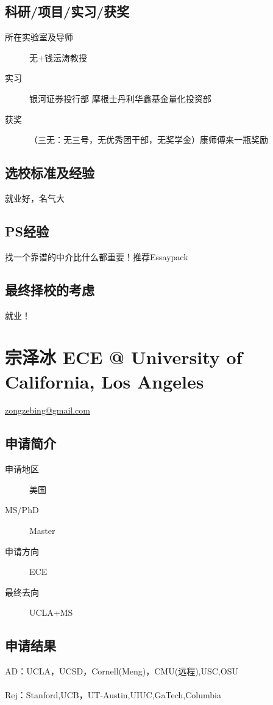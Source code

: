 \documentclass[11pt,fleqn,openany]{book} %
\begin{document}
\subsection*{科研/项目/实习/获奖}
\begin{description}
\item[所在实验室及导师] 无+钱沄涛教授
\item[实习] 银河证券投行部
摩根士丹利华鑫基金量化投资部
\item[获奖] （三无：无三号，无优秀团干部，无奖学金）康师傅来一瓶奖励
\end{description}
\subsection*{选校标准及经验}
就业好，名气大
\subsection*{PS经验}
找一个靠谱的中介比什么都重要！推荐Essaypack
\subsection*{最终择校的考虑}
就业！
\clearpage
\section{宗泽冰 ECE @ University of California, Los Angeles}
\hfill \href{mailto:zongzebing@gmail.com}{zongzebing@gmail.com}

\noindent\begin{minipage}[t]{0.45\textwidth}
\subsection*{申请简介}
\begin{description}
\item[申请地区] 美国
\item[MS/PhD] Master
\item[申请方向] ECE
\item[最终去向] UCLA+MS
\end{description}
\end{minipage}
\hfill
\begin{minipage}[t]{0.45\textwidth}
\subsection*{申请结果}
\noindent AD：UCLA，UCSD，Cornell(Meng)，CMU(远程),USC,OSU\\
\\
Rej：Stanford,UCB，UT-Austin,UIUC,GaTech,Columbia
\end{minipage}
\end{document}
